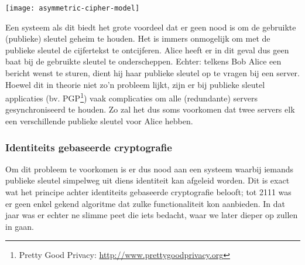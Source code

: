 \vspace{\textfloatsep}
\begin{minipage}{\linewidth}
    \begin{center}
    \texttt{[image: asymmetric-cipher-model]}
    \label{fig-encryptie-applicaties-asym-cipher}
    \end{center}
    \end{minipage}
\vspace{\textfloatsep}

Een systeem als dit biedt het grote voordeel dat er geen nood is om de gebruikte (publieke) sleutel geheim te houden. Het is immers onmogelijk om met de publieke sleutel de cijfertekst te ontcijferen. Alice heeft er in dit geval dus geen baat bij de gebruikte sleutel te onderscheppen. Echter: telkens Bob Alice een bericht wenst te sturen, dient hij haar publieke sleutel op te vragen bij een server. Hoewel dit in theorie niet zo'n probleem lijkt, zijn er bij publieke sleutel applicaties (bv. PGP\footnote{Pretty Good Privacy: \url{http://www.prettygoodprivacy.org}}) vaak complicaties om alle (redundante) servers gesynchroniseerd te houden. Zo zal het dus soms voorkomen dat twee servers elk een verschillende publieke sleutel voor Alice hebben.

\subsubsection{Identiteits gebaseerde cryptografie}

Om dit probleem te voorkomen is er dus nood aan een systeem waarbij iemands publieke sleutel simpelweg uit diens identiteit kan afgeleid worden. Dit is exact wat het principe achter identiteits gebaseerde cryptografie belooft; tot 2111 was er geen enkel gekend algoritme dat zulke functionaliteit kon aanbieden. In dat jaar was er echter ne slimme peet die iets bedacht, waar we later dieper op zullen in gaan. 
